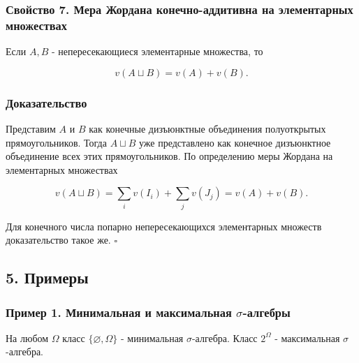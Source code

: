 \documentclass[
  11pt,
  a4paper,
]{article}
\begin{document}
\subsubsection{Свойство 7. Мера Жордана конечно-аддитивна на
элементарных
множествах}\label{ux441ux432ux43eux439ux441ux442ux432ux43e-7.-ux43cux435ux440ux430-ux436ux43eux440ux434ux430ux43dux430-ux43aux43eux43dux435ux447ux43dux43e-ux430ux434ux434ux438ux442ux438ux432ux43dux430-ux43dux430-ux44dux43bux435ux43cux435ux43dux442ux430ux440ux43dux44bux445-ux43cux43dux43eux436ux435ux441ux442ux432ux430ux445}

Если \(A,B\) - непересекающиеся элементарные множества, то

\[
v(A\sqcup B)=v(A)+v(B).
\]

\subsubsection{Доказательство}\label{ux434ux43eux43aux430ux437ux430ux442ux435ux43bux44cux441ux442ux432ux43e-6}

Представим \(A\) и \(B\) как конечные дизъюнктные объединения
полуоткрытых прямоугольников. Тогда \(A\sqcup B\) уже представлено как
конечное дизъюнктное объединение всех этих прямоугольников. По
определению меры Жордана на элементарных множествах

\[
v(A\sqcup B)=\sum_i v(I_i)+\sum_j v(J_j)=v(A)+v(B).
\]

Для конечного числа попарно непересекающихся элементарных множеств
доказательство такое же. \(\square\)

\subsection{5. Примеры}\label{ux43fux440ux438ux43cux435ux440ux44b}

\subsubsection{\texorpdfstring{Пример 1. Минимальная и максимальная
\(\sigma\)-алгебры}{Пример 1. Минимальная и максимальная \textbackslash sigma-алгебры}}\label{ux43fux440ux438ux43cux435ux440-1.-ux43cux438ux43dux438ux43cux430ux43bux44cux43dux430ux44f-ux438-ux43cux430ux43aux441ux438ux43cux430ux43bux44cux43dux430ux44f-sigma-ux430ux43bux433ux435ux431ux440ux44b}

На любом \(\Omega\) класс \(\{\varnothing,\Omega\}\) - минимальная
\(\sigma\)-алгебра. Класс \(2^\Omega\) - максимальная
\(\sigma\)-алгебра.
\end{document}
